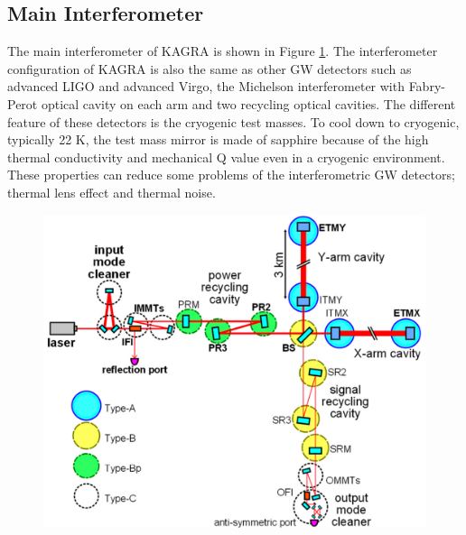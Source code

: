 \subsection{Main Interferometer}
The main interferometer of KAGRA is shown in Figure \ref{img:img601}. The interferometer configuration of KAGRA is also the same as other GW detectors such as advanced LIGO and advanced Virgo, the Michelson interferometer with Fabry-Perot optical cavity on each arm and two recycling optical cavities. The different feature of these detectors is the cryogenic test masses. To cool down to cryogenic, typically 22 K, the test mass mirror is made of sapphire because of the high thermal conductivity and mechanical Q value even in a cryogenic environment. These properties can reduce some problems of the interferometric GW detectors; thermal lens effect and thermal noise.
\begin{figure}[p]
  \begin{minipage}{15cm}
    \begin{center}   
      \includegraphics[width=13cm]{./img_chap6/img601.png}
      \label{img:img601} \hfill\vspace{10pt}
    \end{center}
  \end{minipage}
  \begin{minipage}{15cm}
    \begin{center}   

\end{center}
\end{minipage}
\end{figure}
